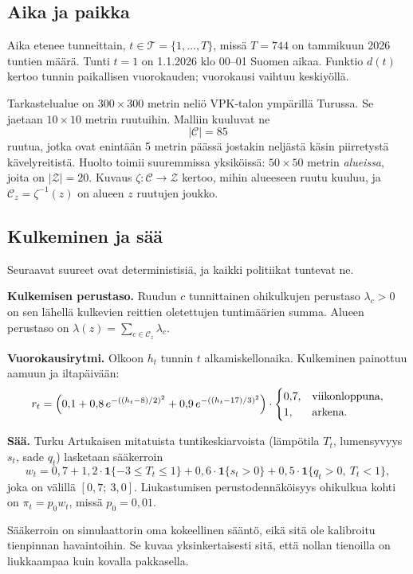 \documentclass[11pt,a4paper]{article}
\theoremstyle{plain}
\theoremstyle{definition}
\theoremstyle{remark}
\newcommand{\cC}{\mathcal{C}}
\newcommand{\cZ}{\mathcal{Z}}
\newcommand{\cT}{\mathcal{T}}
\newcommand{\1}{\mathbf{1}}
\begin{document}
\subsection{Aika ja paikka}

Aika etenee tunneittain, $t \in \cT = \{1, \dots, T\}$, missä $T = 744$ on
tammikuun 2026 tuntien määrä. Tunti $t = 1$ on 1.1.2026 klo 00--01 Suomen aikaa.
Funktio $d(t)$ kertoo tunnin paikallisen vuorokauden; vuorokausi vaihtuu
keskiyöllä.

Tarkastelualue on $300 \times 300$ metrin neliö VPK-talon ympärillä
Turussa. Se jaetaan $10 \times 10$ metrin ruutuihin. Malliin kuuluvat ne
\[
  |\cC| = 85
\]
ruutua, jotka ovat enintään 5 metrin päässä jostakin neljästä käsin piirretystä
kävelyreitistä. Huolto toimii suuremmissa yksiköissä: $50 \times 50$ metrin
\emph{alueissa}, joita on $|\cZ| = 20$. Kuvaus $\zeta\colon \cC \to \cZ$ kertoo,
mihin alueeseen ruutu kuuluu, ja $\cC_z = \zeta^{-1}(z)$ on alueen $z$ ruutujen
joukko.

\subsection{Kulkeminen ja sää}

Seuraavat suureet ovat deterministisiä, ja kaikki politiikat tuntevat ne.

\textbf{Kulkemisen perustaso.} Ruudun $c$ tunnittainen ohikulkujen perustaso
$\lambda_c > 0$ on sen lähellä kulkevien reittien oletettujen tuntimäärien
summa. Alueen perustaso on $\lambda(z) = \sum_{c \in \cC_z} \lambda_c$.

\textbf{Vuorokausirytmi.} Olkoon $h_t$ tunnin $t$ alkamiskellonaika. Kulkeminen
painottuu aamuun ja iltapäivään:
\[
  r_t = \Bigl(0{,}1 + 0{,}8\, e^{-((h_t - 8)/2)^2} + 0{,}9\, e^{-((h_t - 17)/3)^2}\Bigr)
  \cdot
  \begin{cases} 0{,}7, & \text{viikonloppuna},\\ 1, & \text{arkena}. \end{cases}
\]

\textbf{Sää.} Turku Artukaisen mitatuista tuntikeskiarvoista (lämpötila $T_t$,
lumensyvyys $s_t$, sade $q_t$) lasketaan sääkerroin
\[
  w_t = 0{,}7 + 1{,}2 \cdot \1\{-3 \le T_t \le 1\} + 0{,}6 \cdot \1\{s_t > 0\}
        + 0{,}5 \cdot \1\{q_t > 0,\ T_t < 1\},
\]
joka on välillä $[0{,}7;\ 3{,}0]$. Liukastumisen perustodennäköisyys
ohikulkua kohti on $\pi_t = p_0 w_t$, missä $p_0 = 0{,}01$.

Sääkerroin on simulaattorin oma kokeellinen sääntö, eikä sitä ole kalibroitu
tienpinnan havaintoihin. Se kuvaa yksinkertaisesti sitä, että nollan tienoilla
on liukkaampaa kuin kovalla pakkasella.
\end{document}
